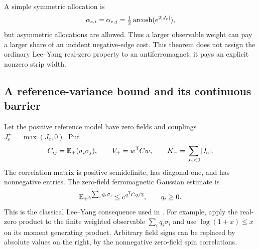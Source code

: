 A simple symmetric allocation is
\[
 \alpha_{e,i}=\alpha_{e,j}
 =\tfrac12\operatorname{arcosh}(e^{2\lvert J_e\rvert}),
\]
but asymmetric allocations are allowed. Thus a larger observable weight can pay a larger share of an incident negative-edge cost. This theorem does not assign the ordinary Lee--Yang real-zero property to an antiferromagnet; it pays an explicit nonzero strip width.

\subsection{A reference-variance bound and its continuous barrier}
Let the positive reference model have zero fields and couplings $J_e^+=\max(J_e,0)$. Put
\[
 C_{ij}=\mathbb E_+(\sigma_i\sigma_j),\qquad V_+=w^{\mathsf T}Cw,
 \qquad K_-=\sum_{J_e<0}\lvert J_e\rvert.
\]
The correlation matrix is positive semidefinite, has diagonal one, and has nonnegative entries. The zero-field ferromagnetic Gaussian estimate is
\begin{equation}\label{eq:ferro-Gaussian}
 \mathbb E_+e^{\sum_i q_i\sigma_i}\le e^{q^{\mathsf T}Cq/2},\qquad q_i\ge0.
\end{equation}
This is the classical Lee--Yang consequence used in \cite[strip theorem]{R1001}. For example, apply the real-zero product to the finite weighted observable $\sum_iq_i\sigma_i$ and use $\log(1+x)\le x$ on its moment generating product. Arbitrary field signs can be replaced by absolute values on the right, by the nonnegative zero-field spin correlations.

